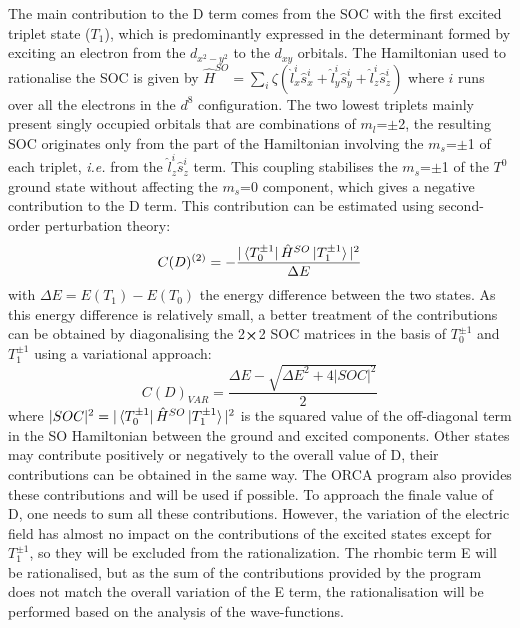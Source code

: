 \documentclass[12pt]{report}
\numberwithin{equation}{section}
\begin{document}
The main contribution to the D term comes from the SOC with the first excited triplet state ($T_1$), which is predominantly expressed in the determinant formed by exciting an electron from the $d_{x^2-y^2}$ to the $d_{xy}$ orbitals.
The Hamiltonian used to rationalise the SOC is given by $\hat{H}^{SO}=\sum_{i} \zeta(\hat{l}_x^i\hat{s}_x^i+\hat{l}_y^i\hat{s}_y^i+\hat{l}_z^i\hat{s}_z^i)$ where $i$ runs over all the electrons in the $d^8$ configuration.
The two lowest triplets mainly present singly occupied orbitals that are combinations of $m_l$=$\pm$2, the resulting SOC originates only from the part of the Hamiltonian involving the $m_s$=$\pm$1 of each triplet, \textit{i.e.} from the $\hat{l}_z^i\hat{s}_z^i$ term.
This coupling stabilises the $m_s$=$\pm$1 of the $T^0$ ground state without affecting the $m_s$=0 component, which gives a negative contribution to the D term.
This contribution can be estimated using second-order perturbation theory:
\begin{equation}\label{ContrPert}
    C(D)^{(2)}=-\frac{|\bra{T_0^{\pm1}}\hat{H}^{SO}\ket{T_1^{\pm1}}|^2}{\Delta E}
\end{equation}
with $\Delta E = E(T_1)-E(T_0)$ the energy difference between the two states.
As this energy difference is relatively small, a better treatment of the contributions can be obtained by diagonalising the 2$\cross$2 SOC matrices in the basis of $T_0^{\pm1}$ and $T_1^{\pm1}$ using a variational approach:
\begin{equation}
    C(D)_{VAR}=\frac{\Delta E -\sqrt{\Delta E^2+4|SOC|^2}}{2}
\end{equation}
where $|SOC|^2={|\bra{T_0^{\pm1}}\hat{H}^{SO}\ket{T_1^{\pm1}}|^2}$ is the squared value of the off-diagonal term in the SO Hamiltonian between the ground and excited components.
Other states may contribute positively or negatively to the overall value of D, their contributions can be obtained in the same way. 
The ORCA program also provides these contributions and will be used if possible. To approach the finale value of D, one needs to sum all these contributions.
However, the variation of the electric field has almost no impact on the contributions of the excited states except for $T_1^{\pm1}$, so they will be excluded from the rationalization.
The rhombic term E will be rationalised, but as the sum of the contributions provided by the program does not match the overall variation of the E term, the rationalisation will be performed based on the analysis of the wave-functions.
\end{document}
